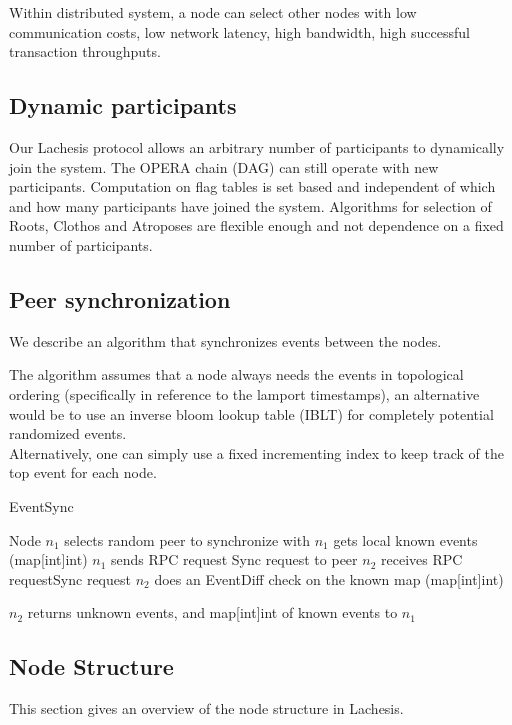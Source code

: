 \documentclass{article}
\begin{document}
Within distributed system, a node can select other nodes with low communication costs, low network latency, high bandwidth, high successful transaction throughputs.

\subsection{Dynamic participants}
Our Lachesis protocol allows an arbitrary number of participants to dynamically join the system. The OPERA chain (DAG) can still operate with new participants. Computation on flag tables is set based and independent of which and how many participants have joined the system. Algorithms for selection of Roots, Clothos and Atroposes are flexible enough and not dependence on a fixed number of participants.

\subsection{Peer synchronization}

We describe an algorithm that synchronizes events between the nodes.

The algorithm assumes that a node always needs the events in topological ordering (specifically in reference to the lamport timestamps), an alternative would be to use an inverse bloom lookup table (IBLT) for completely potential randomized events. \\

Alternatively, one can simply use a fixed incrementing index to keep track of the top event for each node.\\

\begin{algorithm}
	\caption{EventSync}\label{al:syncevents}
	\begin{algorithmic}[1]
		\State Node $n_1$ selects random peer to synchronize with
		\State $n_1$ gets local known events (map[int]int)
		\State $n_1$ sends RPC request Sync request to peer
		\State $n_2$ receives RPC requestSync request
		\State $n_2$ does an EventDiff check on the known map (map[int]int)
		
		\State $n_2$ returns unknown events, and map[int]int of known events to $n_1$		
		
		\EndProcedure
	\end{algorithmic}
\end{algorithm}

\subsection{Node Structure}
This section gives an overview of the node structure in Lachesis.
\end{document}
